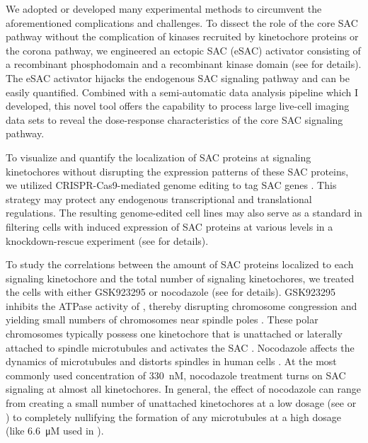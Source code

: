 We adopted or developed many experimental methods to circumvent the aforementioned complications and challenges. To dissect the role of the core SAC pathway without the complication of kinases recruited by kinetochore proteins or the corona pathway, we engineered an ectopic SAC (eSAC) activator consisting of a recombinant  phosphodomain and a recombinant  kinase domain (see  for details). The eSAC activator hijacks the endogenous SAC signaling pathway and can be easily quantified. Combined with a semi-automatic data analysis pipeline which I developed, this novel tool offers the capability to process large live-cell imaging data sets to reveal the dose-response characteristics of the core SAC signaling pathway.

To visualize and quantify the localization of SAC proteins at signaling kinetochores without disrupting the expression patterns of these SAC proteins, we utilized CRISPR-Cas9-mediated genome editing to tag SAC genes  \cite{HDRTiming}. This strategy may protect any endogenous transcriptional and translational regulations. The resulting genome-edited cell lines may also serve as a standard in filtering cells with induced expression of SAC proteins at various levels in a knockdown-rescue experiment (see  for details).

To study the correlations between the amount of SAC proteins localized to each signaling kinetochore and the total number of signaling kinetochores, we treated the cells with either GSK923295 or nocodazole (see  for details). GSK923295 inhibits the ATPase activity of , thereby disrupting chromosome congression and yielding small numbers of chromosomes near spindle poles \cite{GSK923295}. These polar chromosomes typically possess one kinetochore that is unattached or laterally attached to spindle microtubules and activates the SAC \cite{GSK923295MonastrolCotreatment, GSK923295LateralAttachmentEM, LateralAttachmentSAC}. Nocodazole affects the dynamics of microtubules and distorts spindles in human cells \cite{TypeIIISpindle_330nMNoc, RZZ-MAD1vsBUB1-MAD1_2015}. At the most commonly used concentration of \SI{330}{nM}, nocodazole treatment turns on SAC signaling at almost all kinetochores. In general, the effect of nocodazole can range from creating a small number of unattached kinetochores at a low dosage (see \cite{Ablation, RZZ-MAD1vsBUB1-MAD1_2015} or ) to completely nullifying the formation of any microtubules at a high dosage (like \SI{6.6}{\micro M} used in ).